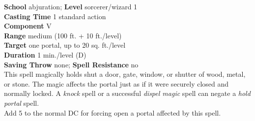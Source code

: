 \textbf{School} abjuration; \textbf{Level} sorcerer/wizard 1\\
\textbf{Casting Time} 1 standard action\\
\textbf{Component }V\\
\textbf{Range }medium (100 ft. + 10 ft./level)\\
\textbf{Target} one portal, up to 20 sq. ft./level\\
\textbf{Duration} 1 min./level (D)\\
\textbf{Saving Throw} none; \textbf{Spell Resistance} no\\
This spell magically holds shut a door, gate, window, or shutter of wood, metal, or stone. The magic affects the portal just as if it were securely closed and normally locked. A \textit{knock }spell or a successful \textit{dispel magic }spell can negate a \textit{hold portal }spell.\\
Add 5 to the normal DC for forcing open a portal affected by this spell.\\

